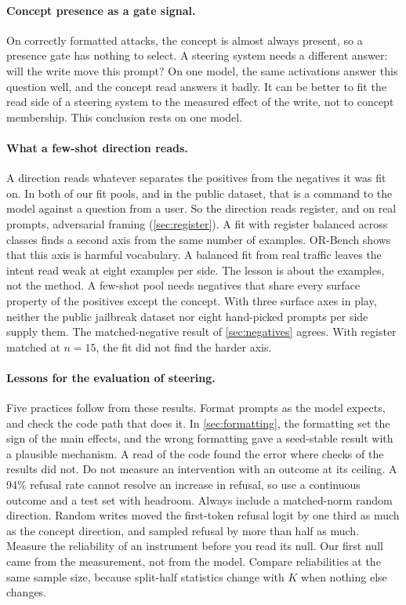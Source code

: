 \documentclass[11pt]{article}
\begin{document}
\paragraph{Concept presence as a gate signal.} On correctly formatted attacks, the concept is almost
always present, so a presence gate has nothing to select. A steering system needs a different answer: will
the write move this prompt? On one model, the same activations answer this question well, and the concept
read answers it badly. It can be better to fit the read side of a steering system to the measured
effect of the write, not to concept membership. This conclusion rests on one model.

\paragraph{What a few-shot direction reads.} A direction reads whatever separates the positives from the
negatives it was fit on. In both of our fit pools, and in the public dataset, that is a command to the model
against a question from a user. So the direction reads register, and on real prompts, adversarial framing
(\cref{sec:register}). A fit with register balanced across classes finds a second axis from the same number
of examples. OR-Bench shows that this axis is harmful vocabulary. A balanced fit from real traffic leaves
the intent read weak at eight examples per side. The lesson is about the examples, not the method.
A few-shot pool needs negatives that share every surface property of the positives except the concept.
With three surface axes in play, neither the public jailbreak dataset nor eight hand-picked prompts per
side supply them. The matched-negative result of \cref{sec:negatives} agrees. With register matched at
$n=15$, the fit did not find the harder axis.

\paragraph{Lessons for the evaluation of steering.} Five practices follow from these results. Format
prompts as the model expects, and check the code path that does it. In \cref{sec:formatting}, the formatting
set the sign of the main effects, and the wrong formatting gave a seed-stable result with a plausible
mechanism. A read of the code found the error where checks of the results did not. Do not measure an
intervention with an outcome at its ceiling. A 94\% refusal rate cannot resolve an increase in refusal, so
use a continuous outcome and a test set with headroom. Always include a matched-norm random direction.
Random writes moved the first-token refusal logit by one third as much as the concept direction, and
sampled refusal by more than half as much. Measure the reliability of an instrument before you read its
null. Our first null came from the measurement, not from the model. Compare reliabilities at the same
sample size, because split-half statistics change with $K$ when nothing else changes.
\end{document}
